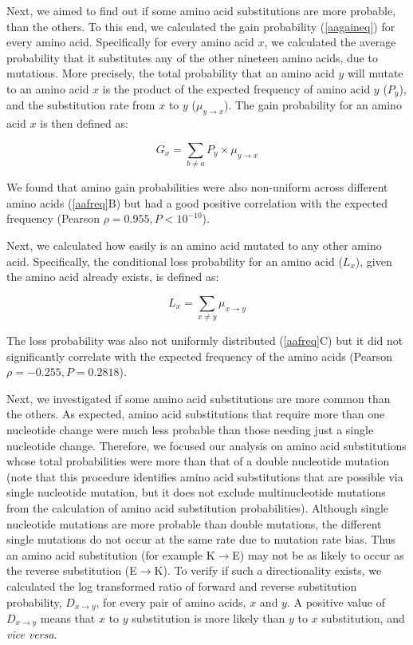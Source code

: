 \documentclass[12pt,a4paper]{article}
\begin{document}
Next, we aimed to find out if some amino acid substitutions are more probable, than the others. To this end, we calculated the gain probability (\autoref{aagaineq}) for every amino acid. Specifically for every amino acid $x$, we calculated the average probability that it substitutes any of the other nineteen amino acids, due to mutations. More precisely, the total probability that an amino acid $y$ will mutate to an amino acid $x$ is the product of the expected frequency of amino acid $y$ ($P_y$), and the substitution rate from $x$ to $y$ ($\mu_{y\to x}$). The gain probability for an amino acid $x$ is then defined as:

\begin{equation}
G_x = \sum_{b \neq a} P_y \times \mu_{y\to x}
\label{aagaineq}
\end{equation}

We found that amino gain probabilities were also non-uniform across different amino acids (\autoref{aafreq}{\color{blue}B}) but had a good positive correlation with the expected frequency (Pearson $\rho = 0.955, P<10^{-10}$).

Next, we calculated how easily is an amino acid mutated to any other amino acid. Specifically, the conditional loss probability for an amino acid ($L_x$), given the amino acid already exists, is defined as:

\begin{equation}
L_x = \sum_{x \neq y} \mu_{x\to y}
\label{aalosseq}
\end{equation}


The loss probability was also not uniformly distributed (\autoref{aafreq}{\color{blue}C}) but it did not significantly correlate with the expected frequency of the amino acids (Pearson $\rho = -0.255, P = 0.2818$).

Next, we investigated if some amino acid substitutions are more common than the others. As expected, amino acid substitutions that require more than one nucleotide change were much less probable than those needing just a single nucleotide change. Therefore, we focused our analysis on amino acid substitutions whose total probabilities were more than that of a double nucleotide mutation (note that this procedure identifies amino acid substitutions that are possible via single nucleotide mutation, but it does not exclude multinucleotide mutations from the calculation of amino acid substitution probabilities). Although single nucleotide mutations are more probable than double mutations, the different single mutations do not occur at the same rate due to mutation rate bias. Thus an amino acid substitution (for example K$\to$E) may not be as likely to occur as the reverse substitution (E$\to$K). To verify if such a directionality exists, we calculated the log transformed ratio of forward and reverse substitution probability, $D_{x\to y}$, for every pair of amino acids, $x$ and $y$. A positive value of $D_{x\to y}$ means that $x$ to $y$ substitution is more likely than $y$ to $x$ substitution, and \textit{vice versa}.
\end{document}
